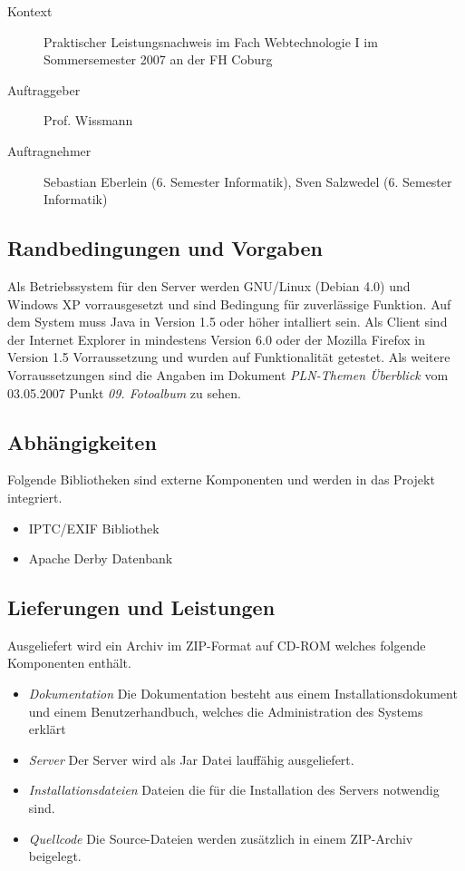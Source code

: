 \documentclass[a4paper,12pt,liststotocnumbered]{scrartcl}
\begin{document}
\begin{description}
	\item[Kontext] Praktischer Leistungsnachweis im Fach Webtechnologie I
		im Sommersemester 2007 an der FH Coburg
	\item[Auftraggeber] Prof. Wissmann
	\item[Auftragnehmer] Sebastian Eberlein (6. Semester Informatik), Sven
		Salzwedel (6. Semester Informatik)
\end{description}

\subsection{Randbedingungen und Vorgaben}

Als Betriebssystem für den Server werden GNU/Linux (Debian 4.0) und Windows XP
vorrausgesetzt und sind Bedingung für zuverlässige Funktion. Auf dem System
muss Java in Version 1.5 oder höher intalliert sein. Als Client sind der
Internet Explorer in mindestens Version 6.0 oder der Mozilla Firefox in
Version 1.5 Vorraussetzung und wurden auf Funktionalität getestet. Als weitere
Vorraussetzungen sind die Angaben im Dokument \textit{PLN-Themen Überblick}
vom 03.05.2007 Punkt \textit{09. Fotoalbum} zu sehen.

\subsection{Abhängigkeiten}

Folgende Bibliotheken sind externe Komponenten und werden in das Projekt
integriert.

\begin{itemize}
	\item IPTC/EXIF Bibliothek
	\item Apache Derby Datenbank
\end{itemize}

\subsection{Lieferungen und Leistungen}

Ausgeliefert wird ein Archiv im ZIP-Format auf CD-ROM welches folgende
Komponenten enthält.

\begin{itemize}

	\item \textit{Dokumentation} Die Dokumentation besteht aus einem
		Installationsdokument und einem Benutzerhandbuch, welches die
		Administration des Systems erklärt

	\item \textit{Server} Der Server wird als Jar Datei lauffähig
		ausgeliefert.
	
	\item \textit{Installationsdateien} Dateien die für die Installation
		des Servers notwendig sind.

	\item \textit{Quellcode} Die Source-Dateien werden zusätzlich in einem
		ZIP-Archiv beigelegt.

\end{itemize}
\end{document}
